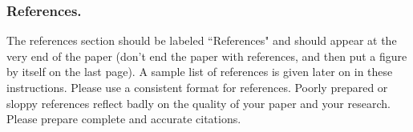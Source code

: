 \documentclass[letterpaper]{article} %
\begin{document}


\subsubsection{References.}
The references section should be labeled ``References" and should appear at the very end of the paper (don't end the paper with references, and then put a figure by itself on the last page). A sample list of references is given later on in these instructions. Please use a consistent format for references. Poorly prepared or sloppy references reflect badly on the quality of your paper and your research. Please prepare complete and accurate citations.



\end{document}

